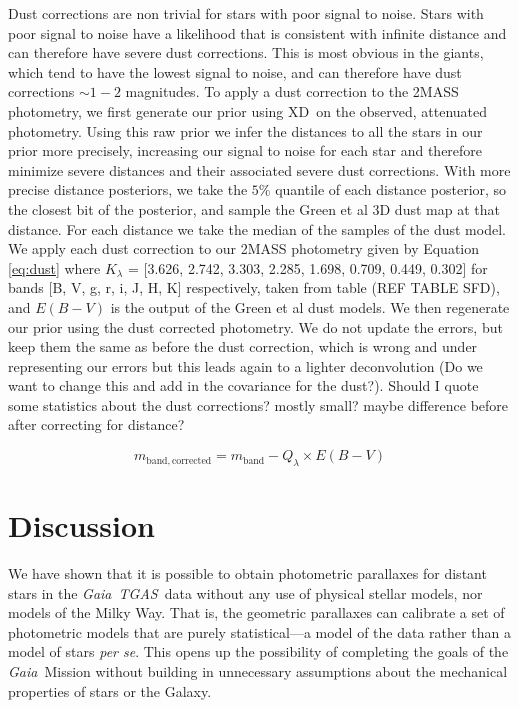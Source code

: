 \documentclass[12pt, preprint]{aastex6}
\newcommand{\foreign}[1]{\textsl{#1}}
\newcommand{\acronym}[1]{{\small{#1}}}
\newcommand{\project}[1]{\textsl{#1}}
\newcommand{\tgas}{\project{\acronym{TGAS}}}
\newcommand{\gaia}{\project{Gaia}}
\newcommand{\xd}{\acronym{XD}}
\begin{document}
Dust corrections are non trivial for stars with poor signal to noise. Stars with poor signal to noise have a likelihood that is consistent with infinite distance and can therefore have severe dust corrections. This is most obvious in the giants, which tend to have the lowest signal to noise, and can therefore have dust corrections $\sim 1-2$ magnitudes. To apply a dust correction to the 2MASS photometry, we first generate our prior using \xd\ on the observed, attenuated photometry. Using this raw prior we infer the distances to all the stars in our prior more precisely, increasing our signal to noise for each star and therefore minimize severe distances and their associated severe dust corrections. With more precise distance posteriors, we take the $5\%$ quantile of each distance posterior, so the closest bit of the posterior, and sample the Green et al 3D dust map at that distance. For each distance we take the median of the samples of the dust model. We apply each dust correction to our 2MASS photometry given by Equation \ref{eq:dust} where $K_{\lambda}$ = [3.626, 2.742, 3.303, 2.285, 1.698, 0.709, 0.449, 0.302] for bands [B, V, g, r, i, J, H, K] respectively, taken from table (REF TABLE SFD), and $E(B-V)$ is the output of the Green et al dust models. We then regenerate our prior using the dust corrected photometry. We do not update the errors, but keep them the same as before the dust correction, which is wrong and under representing our errors but this leads again to a lighter deconvolution (Do we want to change this and add in the covariance for the dust?). Should I quote some statistics about the dust corrections? mostly small? maybe difference before after correcting for distance?

\begin{equation}
\label{eq:dust}
m_{\mathrm{band, corrected}} = m_{\mathrm{band}} - Q_{\lambda} \times E(B-V)
\end{equation}

\section{Discussion}

We have shown that it is possible to obtain photometric parallaxes for
distant stars in the \gaia\ \tgas\ data without any use of physical stellar
models, nor models of the Milky Way.
That is, the geometric parallaxes can calibrate a set of photometric
models that are purely statistical---a model of the data rather than
a model of stars \foreign{per se}.
This opens up the possibility of completing the goals of the \gaia\ Mission
without building in unnecessary assumptions about the mechanical properties
of stars or the Galaxy.
\end{document}

